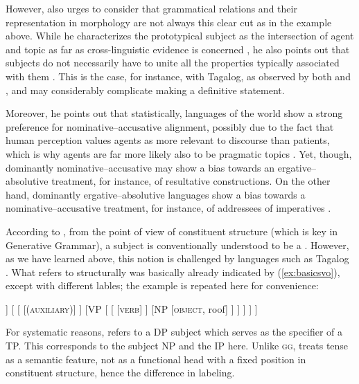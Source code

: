 However, \citet{comrie1989} also urges to consider that grammatical relations
and their representation in morphology are not always this clear cut as in the
example above. While he characterizes the prototypical subject as the
intersection of agent and topic as far as cross-linguistic evidence is
concerned \citep[107]{comrie1989}, he also points out that subjects do not
necessarily have to unite all the properties typically associated with them
\citep[110]{comrie1989}. This is the case, for instance, with Tagalog, as
observed by both \citet{schachter1976} and \citet{kroeger1991}, and may
considerably complicate making a definitive statement.

Moreover, he points out that statistically, languages of the world show a
strong preference for nominative--accusative alignment, possibly due to the
fact that human perception values agents as more relevant to discourse than
patients, which is why agents are far more likely also to be pragmatic topics
\citep[120]{comrie1989}. Yet, though, dominantly nominative--accusative may
show a bias towards an ergative--absolutive treatment, for instance, of
resultative constructions. On the other hand, dominantly ergative--absolutive
languages show a bias towards a nominative--accu\-sa\-tive treatment, for
instance, of addressees of imperatives \citep[116--119]{comrie1989}.

According to \citep{carnie2013}, from the point of view of constituent
structure (which is key in Generative Grammar), a subject is conventionally
understood to be a . However, as
we have learned above, this notion is challenged by languages such as Tagalog
\citep[225]{kroeger1991}. What \citet{carnie2013} refers to structurally was
basically already indicated by (\ref{ex:basicsvo}), except with different
lables; the example is repeated here for convenience:

\ex\label{ex:basicsvo2}
\begin{forest}
[IP
	[NP
		[\textsc{subject}, roof]
	]
	[
		[
			[\textsc{(auxiliary)}]
		]
		[VP
			[
				[
					[\textsc{verb}]
				]
				[NP
					[\textsc{object}, roof]
				]
			]
		]
	]
]
\end{forest}
\xe

For systematic reasons, \citet{carnie2013} refers to a DP subject which serves
as the specifier of a TP. This corresponds to the subject NP and the IP here.
Unlike \textsc{gg}, \Lfg{} treats tense as a semantic feature, not as a
functional head with a fixed position in constituent structure, hence the difference in labeling.


